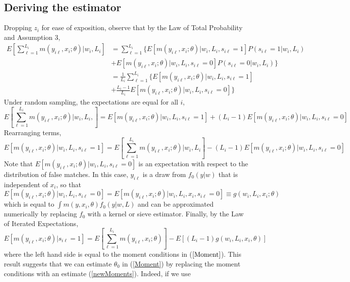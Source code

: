 \documentclass[12pt]{article}
\newcommand{\sumL}{\sum_{\ell=1}^{L_i}}
\newcommand{\meanL}{\frac{1}{L_i}\sumL}
\begin{document}
\subsection{Deriving the estimator}
Dropping $z_i$ for ease of exposition, observe that by the Law of Total Probability and Assumption 3, 
\begin{align*}
    E\left[\sumL m\left(y_{i\ell}, x_i; \theta\right) \Bigg\vert w_i, L_i \right] &=
    \sumL \Big\{ E[m(y_{i\ell}, x_i; \theta) | w_i, L_i, s_{i\ell}=1]P(s_{i\ell}=1| w_i, L_i) 
    \\&+ E[m(y_{i\ell}, x_i; \theta) | w_i, L_i, s_{i\ell}=0] P(s_{i\ell}=0| w_i, L_i) \Big\}\\
    &= \meanL \Bigg\{ E[m(y_{i\ell}, x_i; \theta) | w_i, L_i, s_{i\ell} = 1] \\&+ \frac{L_i-1}{L_i}E[m(y_{i\ell}, x_i; \theta) | w_i, L_i, s_{i\ell} = 0] \Bigg\}\end{align*}
Under random sampling, the expectations are equal for all $i$, 
\begin{equation*}
   E\left[\sumL m\left(y_{i\ell}, x_i; \theta\right) \Bigg\vert w_i, L_i, \right] = E\left[m(y_{i\ell}, x_{i}; \theta) | w_i, L_i, s_{i\ell} = 1\right] + (L_i - 1)E\left[m(y_{i\ell}, x_i; \theta) | w_i, L_i, s_{i\ell} =0 \right] 
\end{equation*}
Rearranging terms, 
\begin{equation*} E[m(y_{i\ell}, x_i; \theta) | w_i, L_i, s_{i\ell}=1] = E\left[\sum_{\ell=1}^{L_i} m(y_{i\ell},x_i; \theta)\Bigg\vert w_i, L_i \right] - (L_i-1) E[m(y_{i\ell},x_i; \theta) | w_i, L_i, s_{i\ell} = 0] \end{equation*}
Note that $E[m(y_{i\ell}, x_i; \theta) | w_i, L_i, s_{i\ell} = 0]$ is an expectation with respect to the distribution of false matches.  In this case, $y_{i\ell}$ is a draw from $f_0(y | w)$ that is independent of $x_i$, so that
$$ E[m(y_{i\ell}, x_i; \theta) | w_i, L_i, s_{i\ell} = 0] =  E[m(y_{i\ell}, x_i; \theta) | w_i, L_i, x_i, s_{i\ell} = 0] \equiv g(w_i, L_i, x_i; \theta)$$ 
which is equal to $\int m(y, x_i, \theta)f_0(y | w,L)$ and can be approximated numerically by replacing $f_0$ with a kernel or sieve estimator. Finally, by the Law of Iterated Expectations,
\begin{equation}
E[m(y_{i\ell}, x_i; \theta) | s_{i\ell}=1] = E\left[\sum_{\ell=1}^{L_i} m(y_{i\ell},x_i; \theta)\right] -  E[(L_i -1)g(w_i,L_i,x_i, \theta)] \label{newMoments}
\end{equation}
where the left hand side is equal to the moment conditions in ($\ref{Moment}$).  This result suggests that we can estimate $\theta_0$ in (\ref{Moment}) by replacing the moment conditions with an estimate (\ref{newMoments}).  Indeed, if we use
\end{document}
